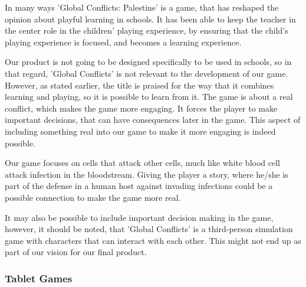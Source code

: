 In many ways 'Global Conflicts: Palestine' is a game, that has reshaped the opinion about playful learning in schools. It has been able to keep the teacher in the center role in the children' playing experience, by ensuring that the child's playing experience is focused, and becomes a learning experience.\cite{laeringpaaspil}\newline

Our product is not going to be designed specifically to be used in schools, so in that regard, 'Global Conflicts' is not relevant to the development of our game.
However, as stated earlier, the title is praised for the way that it combines learning and playing, so it is possible to learn from it.
The game is about a real conflict, which makes the game more engaging.
It forces the player to make important decisions, that can have consequences later in the game.
This aspect of including something real into our game to make it more engaging is indeed possible.

Our game focuses on cells that attack other cells, much like white blood cell attack infection in the bloodstream. Giving the player a story, where he/she is part of the defense in a human host against invading infections could be a possible connection to make the game more real.

It may also be possible to include important decision making in the game, however, it should be noted, that 'Global Conflicts' is a third-person simulation game with characters that can interact with each other. This might not end up as part of our vision for our final product.

\subsubsection{Tablet Games}


